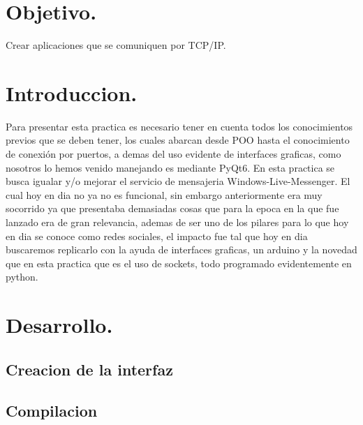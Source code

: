 \documentclass[11pt]{article}
\begin{document}
\newpage																		

\tableofcontents 

\newpage

\section{Objetivo.}
Crear aplicaciones que se comuniquen por TCP/IP.

\section{Introduccion.} 
Para presentar esta practica es necesario tener en cuenta todos los conocimientos previos que se deben tener, los cuales abarcan desde POO hasta el conocimiento de conexión por puertos, a demas del uso evidente de interfaces graficas, como nosotros lo hemos venido manejando es mediante PyQt6. En esta practica se busca igualar y/o mejorar el servicio de mensajeria Windows-Live-Messenger. El cual hoy en dia no ya no es funcional, sin embargo anteriormente era muy socorrido ya que presentaba demasiadas cosas que para la epoca en la que fue lanzado era de gran relevancia, ademas de ser uno de los pilares para lo que hoy en dia se conoce como redes sociales, el impacto fue tal que hoy en dia buscaremos replicarlo con la ayuda de interfaces graficas, un arduino y la novedad que en esta practica que es el uso de sockets, todo programado evidentemente en  python.

\section{Desarrollo.}


\subsection{Creacion de la interfaz}





\subsection{Compilacion}
\end{document}
